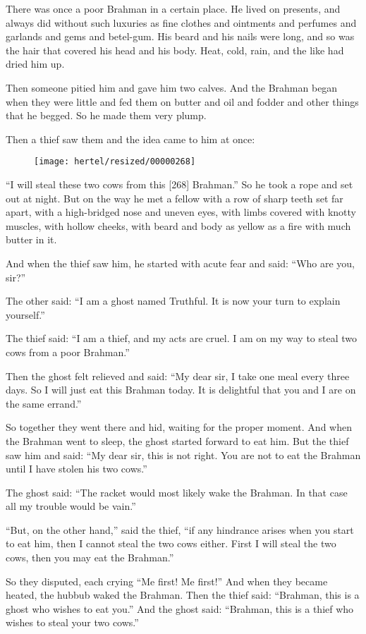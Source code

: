 \documentclass[article, twoside, 10pt]{memoir}
\begin{document}
There was once a poor Brahman in a certain place. He lived on
presents, and always did without such luxuries as fine clothes and
ointments and perfumes and garlands and gems and betel-gum. His
beard and his nails were long, and so was the hair that covered his
head and his body. Heat, cold, rain, and the like had dried him
up.

Then someone pitied him and gave him two calves. And the Brahman
began when they were little and fed them on butter and oil and
fodder and other things that he begged. So he made them very
plump.

Then a thief saw them and the idea came to him at once:
\begin{figure}[p]\texttt{[image: hertel/resized/00000268]}\end{figure}``I will steal these two cows from this [268] Brahman.'' So he took
a rope and set out at night. But on the way he met a fellow with a
row of sharp teeth set far apart, with a high-bridged nose and
uneven eyes, with limbs covered with knotty muscles, with hollow
cheeks, with beard and body as yellow as a fire with much butter in
it.

And when the thief saw him, he started with acute fear and said:
``Who are you, sir?''

The other said:
``I am a ghost named Truthful. It is now your turn to explain yourself.''

The thief said:
``I am a thief, and my acts are cruel. I am on my way to steal two cows from a poor Brahman.''

Then the ghost felt relieved and said:
``My dear sir, I take one meal every three days. So I will just eat this Brahman today. It is delightful that you and I are on the same errand.''

So together they went there and hid, waiting for the proper moment.
And when the Brahman went to sleep, the ghost started forward to
eat him. But the thief saw him and said:
``My dear sir, this is not right. You are not to eat the Brahman until I have stolen his two cows.''

The ghost said:
``The racket would most likely wake the Brahman. In that case all my trouble would be vain.''

``But, on the other hand,'' said the thief,
``if any hindrance arises when you start to eat him, then I cannot steal the two cows either. First I will steal the two cows, then you may eat the Brahman.''

So they disputed, each crying ``Me first! Me first!'' And when they
became heated, the hubbub waked the Brahman. Then the thief said:
``Brahman, this is a ghost who wishes to eat you.'' And the ghost
said:
``Brahman, this is a thief who wishes to steal your two cows.''
\end{document}
